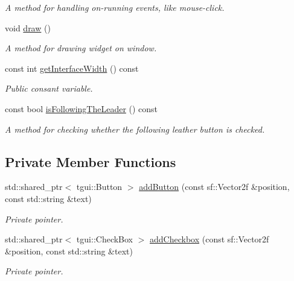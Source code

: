 \begin{DoxyCompactItemize}
\begin{DoxyCompactList}\small\item\em A method for handling on-\/running events, like mouse-\/click. \end{DoxyCompactList}\item 
void \hyperlink{classGraphicalUserInterface_a268c54faf6a8ac32628c60495900ea1c}{draw} ()
\begin{DoxyCompactList}\small\item\em A method for drawing widget on window. \end{DoxyCompactList}\item 
const int \hyperlink{classGraphicalUserInterface_a6b168726ffb57ba7d06946d27435abad}{get\+Interface\+Width} () const
\begin{DoxyCompactList}\small\item\em Public consant variable. \end{DoxyCompactList}\item 
const bool \hyperlink{classGraphicalUserInterface_a9aa8920f70bf99225a7e8e4ff9cb5e3f}{is\+Following\+The\+Leader} () const
\begin{DoxyCompactList}\small\item\em A method for checking whether the following leather button is checked. \end{DoxyCompactList}\end{DoxyCompactItemize}
\subsection*{Private Member Functions}
\begin{DoxyCompactItemize}
\item 
std\+::shared\+\_\+ptr$<$ tgui\+::\+Button $>$ \hyperlink{classGraphicalUserInterface_a91abd8446fe18cee7ff63a541a79da56}{add\+Button} (const sf\+::\+Vector2f \&position, const std\+::string \&text)
\begin{DoxyCompactList}\small\item\em Private pointer. \end{DoxyCompactList}\item 
std\+::shared\+\_\+ptr$<$ tgui\+::\+Check\+Box $>$ \hyperlink{classGraphicalUserInterface_ac7094ec5d8ec8edd7325072f97f8de59}{add\+Checkbox} (const sf\+::\+Vector2f \&position, const std\+::string \&text)
\begin{DoxyCompactList}\small\item\em Private pointer. \end{DoxyCompactList}\end{DoxyCompactItemize}
